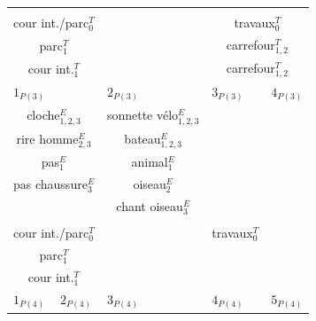 \begin{table}[t]
\begin{tabular}{c|c|c|c|c|c|c}
\multicolumn{2}{c|}{}                      &					       & \multicolumn{4}{c}{} \\
\multicolumn{2}{c|}{cour int./parc$_0^T$}  &                           & \multicolumn{4}{c}{travaux$_0^T$} \\                                                                     
\multicolumn{2}{c|}{parc$_{1}^T$}          &                           & \multicolumn{4}{c}{carrefour$_{1,2}^T$} \\                                                                                                                                 
\multicolumn{2}{c|}{cour int.$_{1}^T$}     &                           & \multicolumn{4}{c}{carrefour$_{1,2}^T$} \\                                                                                          
\hline
\multicolumn{2}{l|}{$1_{P(3)}$} & \multicolumn{1}{l|}{$2_{P(3)}$} & \multicolumn{3}{l|}{$3_{P(3)}$} & \multicolumn{1}{l}{$4_{P(3)}$} \\ 
\multicolumn{2}{c|}{cloche$_{1,2,3}^E$}    & sonnette vélo$_{1,2,3}^E$ & \multicolumn{3}{c|}{}            &  \\         
\multicolumn{2}{c|}{rire homme$_{2,3}^E$}  & bateau$_{1,2,3}^E$        & \multicolumn{3}{c|}{}            & \\ 
\multicolumn{2}{c|}{pas$_{1}^E$}           & animal$_{1}^E$            & \multicolumn{3}{c|}{}            &  \\ 
\multicolumn{2}{c|}{pas chaussure$_{3}^E$} & oiseau$_2^E$              & \multicolumn{3}{c|}{}            &  \\    
\multicolumn{2}{c|}{}                      & chant oiseau$_3^E$        & \multicolumn{3}{c|}{}            & \\			
\multicolumn{2}{c|}{}                      &                           & \multicolumn{3}{c|}{}            & \\		
\multicolumn{2}{c|}{cour int./parc$_0^T$}  &                           & \multicolumn{3}{c|}{travaux$_0^T$} & \\	
\multicolumn{2}{c|}{parc$_1^T$}            &                           & \multicolumn{3}{c|}{}            & \\	
\multicolumn{2}{c|}{cour int.$_1^T$}       &                           & \multicolumn{3}{c|}{}            & \\   		           
\hline
\multicolumn{1}{l|}{$1_{P(4)}$} & \multicolumn{1}{l|}{$2_{P(4)}$} & \multicolumn{1}{l|}{$3_{P(4)}$}  & \multicolumn{3}{l|}{$4_{P(4)}$} & \multicolumn{1}{l}{$5_{P(4)}$} \\

\end{tabular}
\end{table}
